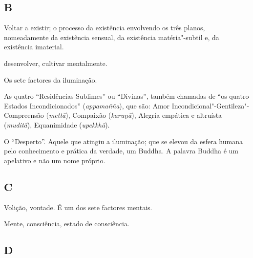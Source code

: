 \subsection{B}

\begin{glossarydescription}

\item[Bhava] Voltar a existir; o processo da existência envolvendo os três planos, nomeadamente da existência sensual, da existência matéria"-subtil e, da existência imaterial.

\item[Bhāvanā] desenvolver, cultivar mentalmente.

\item[Bojjhaṅga] Os sete factores da iluminação.

\item[Brahma"-Vihāra] As quatro “Residências Sublimes” ou “Divinas”, também
chamadas de “os quatro Estados Incondicionados” (\emph{appamañña}), que são:
Amor Incondicional"-Gentileza"-Compreensão (\emph{mettā}), Compaixão
(\emph{karuṇā}), Alegria empática e altruísta (\emph{muditā}), Equanimidade
(\emph{upekkhā}).

\item[Buddha] O “Desperto”. Aquele que atingiu a iluminação; que se elevou da
esfera humana pelo conhecimento e prática da verdade, um Buddha. A palavra
Buddha é um apelativo e não um nome próprio.

\end{glossarydescription}

\subsection{C}

\begin{glossarydescription}

\item[Cetanā] Volição, vontade. É um dos sete factores mentais.

\item[Citta] Mente, consciência, estado de consciência.

\end{glossarydescription}

\subsection{D}

